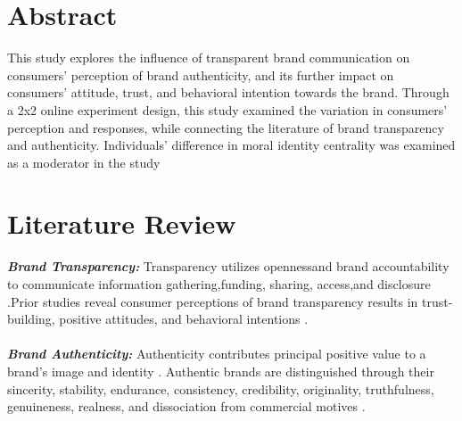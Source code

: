 \documentclass[a0,portrait]{a0poster}
\begin{document}
\begin{minipage}[c]{\linewidth}
\begin{framed}
\begin{multicols}{2}
\section*{Abstract}
\color{Black}
This study explores the influence of transparent brand communication on consumers' perception of brand authenticity, and its further impact on consumers' attitude, trust, and behavioral intention towards the brand. Through a 2x2 online experiment design, this study examined the variation in consumers' perception and responses, while connecting the literature of brand transparency and authenticity. Individuals' difference in moral identity centrality was examined as a moderator in the study
\color{Maroon}
\section*{Literature Review}
\color{Black}
  \color{Maroon} \textbf{\emph{Brand Transparency:}} \color{Black}
Transparency utilizes openness\autocite{parris_exploring_2016}and brand accountability\autocite{yoo_brand_2014} to communicate information gathering,funding, sharing, access,and disclosure \autocite{phillips_online_2009}\autocite{wojdynski_measuring_2018} \autocite{yoo_brand_2014}\autocite{brandao_impact_2018}.Prior studies reveal consumer perceptions of brand transparency results in trust-building, positive attitudes, and behavioral intentions \autocite{reynolds_moral_2008}.\\
\\
  \color{Maroon} \textbf{\emph{Brand Authenticity:}} \color{Black} Authenticity contributes principal positive value to a brand's image \autocite{keller_strategic_1998}\autocite{ballantyne_evolution_2006} and identity \autocite{beverland_crafting_2005}\autocite{kapferer_new_2008}. Authentic brands are distinguished through their sincerity, stability, endurance, consistency, credibility, originality, truthfulness, genuineness, realness, and dissociation from commercial motives \autocite{bruhn_brand_2012}\autocite{grayson_consumer_2004}\autocite{ballantyne_evolution_2006}\autocite{beverland_real_2006}\autocite{holt_why_2002}. 
  \\
  

\end{multicols}
\end{framed}
\end{minipage}
\end{document}

